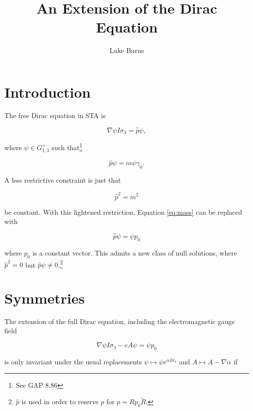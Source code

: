 \documentclass{article}
\title{An Extension of the Dirac Equation}
\author{Luke Burns}
\begin{document}
  \maketitle

  \section{Introduction}

  The free Dirac equation in STA is

  \begin{equation}
    \nabla \psi I \sigma_3 = \hat p \psi, \label{eq:dirac}
  \end{equation}

  where $\psi \in G_{1,3}^+$ such that\footnote{See GAP 8.86}

  \begin{equation}
    \hat p \psi = m \psi \gamma_0. \label{eq:mass}
  \end{equation} 

  A less restrictive constraint is just that

  \begin{equation}
    \hat p^2 = m^2
  \end{equation}

  be constant. With this lightened restriction, Equation \ref{eq:mass} can be replaced with

  \begin{equation}
    \hat p \psi = \psi p_0 \label{eq:momentum}
  \end{equation}

  where $p_0$ is a constant vector. This admits a new class of null solutions, where $\hat p^2 = 0$ but $\hat p \psi \not = 0$.\footnote{$\hat p$ is used in order to reserve $p$ for $p = R p_0 \widetilde R$.}

  \section{Symmetries}

  The extension of the full Dirac equation, including the electromagnetic gauge field

  \begin{equation}
    \nabla \psi I \sigma_3 - e A \psi = \psi p_0 \label{eq:full}
  \end{equation}

  is only invariant under the usual replacements $\psi \mapsto \psi e^{\alpha I \sigma_3}$ and $A \mapsto A - \nabla \alpha$ if 
\end{document}
